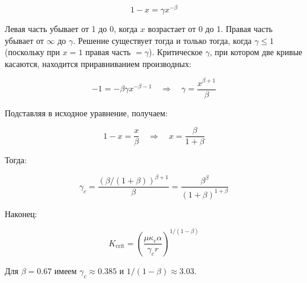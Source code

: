 \documentclass[12pt,a4paper]{article}
\theoremstyle{remark}
\newcommand{\kappac}{\kappa_c}
\begin{document}
	\begin{equation}
		1 - x = \gamma x^{-\beta}
		\label{eq:x-eqn}
	\end{equation}
	
	Левая часть убывает от 1 до 0, когда $x$ возрастает от 0 до 1. Правая часть убывает от $\infty$ до $\gamma$. Решение существует тогда и только тогда, когда $\gamma \leq 1$ (поскольку при $x=1$ правая часть $=\gamma$). Критическое $\gamma$, при котором две кривые касаются, находится приравниванием производных:
	
	\begin{equation}
		-1 = -\beta \gamma x^{-\beta-1} \quad \Rightarrow \quad \gamma = \frac{x^{\beta+1}}{\beta}
		\label{eq:derivative}
	\end{equation}
	
	Подставляя в исходное уравнение, получаем:
	
	\begin{equation}
		1 - x = \frac{x}{\beta} \quad \Rightarrow \quad x = \frac{\beta}{1+\beta}
		\label{eq:x-crit}
	\end{equation}
	
	Тогда:
	
	\begin{equation}
		\gamma_c = \frac{(\beta/(1+\beta))^{\beta+1}}{\beta} = \frac{\beta^{\beta}}{(1+\beta)^{1+\beta}}
		\label{eq:gamma-c-app}
	\end{equation}
	
	Наконец:
	
	\begin{equation}
		K_{\text{crit}} = \left( \frac{\mu \kappac \alpha}{\gamma_c r} \right)^{1/(1-\beta)}
		\label{eq:Kcrit-app}
	\end{equation}
	
	Для $\beta = 0.67$ имеем $\gamma_c \approx 0.385$ и $1/(1-\beta) \approx 3.03$.
	
\end{document}

